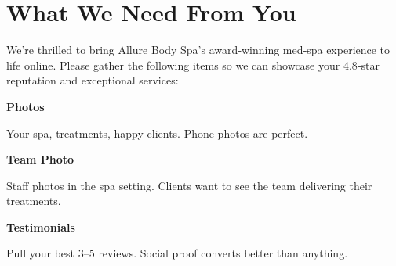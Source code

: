 \documentclass[11pt,letterpaper]{article}
\begin{document}
\vspace{0.2em}

\section*{What We Need From You}

We’re thrilled to bring Allure Body Spa’s award‑winning med‑spa experience to life online. Please gather the following items so we can showcase your 4.8‑star reputation and exceptional services:

\vspace{0.12em}

\noindent\begin{minipage}[t]{0.48\textwidth}
\begin{tcolorbox}[colframe=accent-teal, boxrule=1pt, left=0.7em, right=0.7em, top=0.5em, bottom=0.5em, arc=4pt, boxsep=0pt]
{\bfseries\small\color{accent-teal}Photos}

\vspace{0.15em}

{\small Your spa, treatments, happy clients. Phone photos are perfect.}
\end{tcolorbox}

\vspace{0.1em}

\begin{tcolorbox}[colframe=accent-teal, boxrule=1pt, left=0.7em, right=0.7em, top=0.5em, bottom=0.5em, arc=4pt, boxsep=0pt]
{\bfseries\small\color{accent-teal}Team Photo}

\vspace{0.15em}

{\small Staff photos in the spa setting. Clients want to see the team delivering their treatments.}
\end{tcolorbox}

\vspace{0.1em}

\begin{tcolorbox}[colframe=accent-teal, boxrule=1pt, left=0.7em, right=0.7em, top=0.5em, bottom=0.5em, arc=4pt, boxsep=0pt]
{\bfseries\small\color{accent-teal}Testimonials}

\vspace{0.15em}

{\small Pull your best 3–5 reviews. Social proof converts better than anything.}
\end{tcolorbox}
\end{minipage}
\hfill
\end{document}
